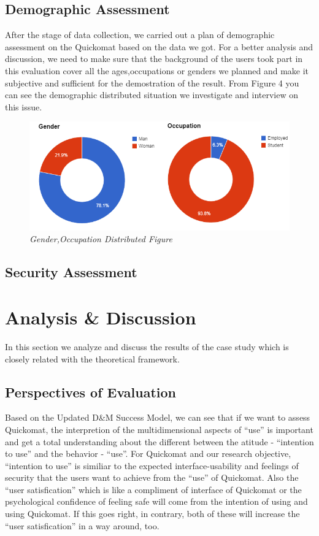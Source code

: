 \documentclass[twocolumn]{article}
\begin{document}
\subsection{Demographic Assessment}
After the stage of data collection, we carried out a plan of demographic assessment on the Quickomat based on the data we got. For a better analysis and discussion, we need to make sure that the background of the users took part in this evaluation cover all the ages,occupations or genders we planned and make it subjective and sufficient for the demostration of the result. From Figure 4 you can see the demographic distributed situation we investigate and interview on this issue.
\begin{figure}
  \centering
  \includegraphics[width=\columnwidth]{fig/demographic-assessment.png}
  \caption{\emph{Gender,Occupation Distributed Figure}}
  \label{fig:demographic-assessment}
\end{figure}

\subsection{Security Assessment}

\section{Analysis \& Discussion}
In this section we analyze and discuss the results of the case study which is closely related with the theoretical framework.

\subsection{Perspectives of Evaluation}
Based on the Updated D\&M Success Model, we can see that if we want to assess Quickomat, the interpretion of the multidimensional aspects of “use” is important and get a total understanding about the different between the atitude - “intention to use” and the behavior - “use”. For Quickomat and our research objective, “intention to use” is similiar to the expected interface-usability and feelings of security that the users want to achieve from the “use” of Quickomat. Also the “user satisfication” which is like a compliment of interface of Quickomat or the psychological confidence of feeling safe will come from the intention of using and using Quickomat. If this goes right, in contrary, both of these will increase the “user satisfication” in a way around, too.  
\end{document}
